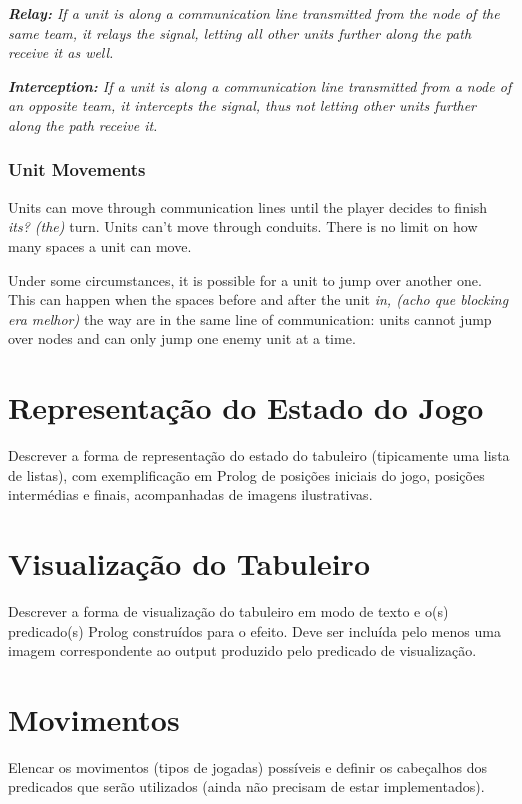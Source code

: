 \documentclass[a4paper]{article}
\begin{document}
\textit{ \textbf{Relay:} If a unit is along a communication line transmitted from the node of the same team, it relays the signal, letting all other units further along the path receive it as well.}

\textit{ \textbf{Interception:} If a unit is along a communication line transmitted from a node of an opposite team, it intercepts the signal, thus not letting other units further along the path receive it. }


\subsubsection{Unit Movements}

Units can move through communication lines until the player decides to finish \textit{its? (the)} turn. Units can't move through conduits. There is no limit on how many spaces a unit can move.


Under some circumstances, it is possible for a unit to jump over another one. This can happen when the spaces before and after the unit \textit{in, (acho que blocking era melhor)} the way are in the same line of communication: units cannot jump over nodes and can only jump one enemy unit at a time.




\section{Representação do Estado do Jogo}

Descrever a forma de representação do estado do tabuleiro (tipicamente uma lista de listas), com exemplificação em Prolog de posições iniciais do jogo, posições intermédias e finais, acompanhadas de imagens ilustrativas.


\section{Visualização do Tabuleiro}

Descrever a forma de visualização do tabuleiro em modo de texto e o(s) predicado(s) Prolog construídos para o efeito.
Deve ser incluída pelo menos uma imagem correspondente ao output produzido pelo predicado de visualização.


\section{Movimentos}

Elencar os movimentos (tipos de jogadas) possíveis e definir os cabeçalhos dos predicados que serão utilizados (ainda não precisam de estar implementados).
\end{document}
